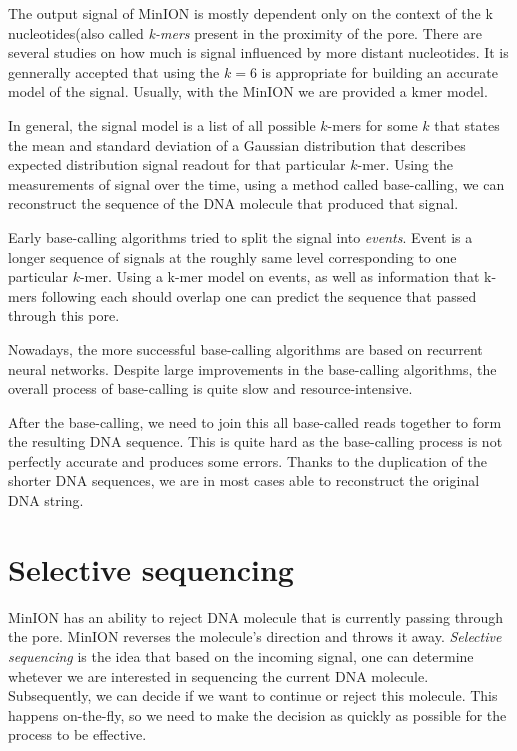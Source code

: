 The output signal of MinION is mostly dependent only on the context of the k
nucleotides(also called \textit{k-mers} present in the proximity of the pore. There are several studies on
how much is signal influenced by more distant nucleotides. It is gennerally accepted
that using the $k = 6$ is appropriate for building an accurate model of the signal. 
Usually, with the MinION we are provided a kmer model.

In general, the signal model is a list of all possible $k$-mers for some $k$
that states the mean and standard deviation of a Gaussian distribution that
describes expected distribution signal readout for that particular $k$-mer.
Using the measurements of signal over the time, using a method called base-calling, we can reconstruct the
sequence of the DNA molecule that produced that signal.

Early base-calling algorithms tried to split the signal into \textit{events}\cite{david2017nanocall}.
Event is a longer sequence of signals at the roughly same level corresponding
to one particular $k$-mer. Using a k-mer model on events, as well as information
that k-mers following each should overlap one can predict the sequence that passed through this pore.

Nowadays, the more successful base-calling algorithms are based on recurrent neural
networks. Despite large improvements in the base-calling algorithms, the overall
process of base-calling is quite slow and resource-intensive.

After the base-calling, we need to join this all base-called reads together to form the
resulting DNA sequence. This is quite hard as the base-calling process is not perfectly
accurate and produces some errors. Thanks to the duplication of the shorter DNA
sequences, we are in most cases able to reconstruct the original DNA string.

\section{Selective sequencing}

MinION has an ability to reject DNA molecule that is currently passing through
the pore. MinION reverses the molecule’s direction and throws it away.
\textit{Selective sequencing} is the idea that based on the incoming signal, one can determine
whetever we are interested in sequencing the current DNA molecule. Subsequently, we can decide if we want
to continue or reject this molecule. This happens on-the-fly, so we need to make
the decision as quickly as possible for the process to be effective.

